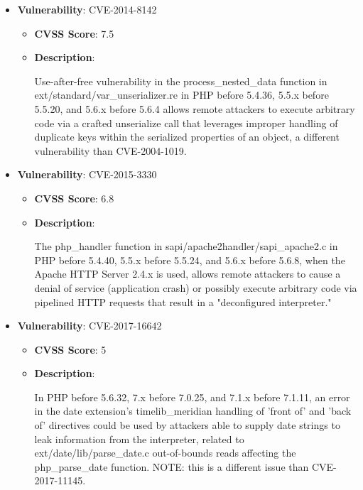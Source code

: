 \documentclass{article}
\begin{document}
\begin{itemize}
        \item \textbf{Vulnerability}: CVE-2014-8142
        \begin{itemize}
            \item \textbf{CVSS Score}:  7.5 
            \item \textbf{Description}:
            \parbox[t]{0.9\linewidth}{
                \ttfamily Use-after-free vulnerability in the process\_nested\_data function in ext/standard/var\_unserializer.re in PHP before 5.4.36, 5.5.x before 5.5.20, and 5.6.x before 5.6.4 allows remote attackers to execute arbitrary code via a crafted unserialize call that leverages improper handling of duplicate keys within the serialized properties of an object, a different vulnerability than CVE-2004-1019.
            }
        \end{itemize}
    
        \item \textbf{Vulnerability}: CVE-2015-3330
        \begin{itemize}
            \item \textbf{CVSS Score}:  6.8 
            \item \textbf{Description}:
            \parbox[t]{0.9\linewidth}{
                \ttfamily The php\_handler function in sapi/apache2handler/sapi\_apache2.c in PHP before 5.4.40, 5.5.x before 5.5.24, and 5.6.x before 5.6.8, when the Apache HTTP Server 2.4.x is used, allows remote attackers to cause a denial of service (application crash) or possibly execute arbitrary code via pipelined HTTP requests that result in a "deconfigured interpreter."
            }
        \end{itemize}
    
        \item \textbf{Vulnerability}: CVE-2017-16642
        \begin{itemize}
            \item \textbf{CVSS Score}:  5 
            \item \textbf{Description}:
            \parbox[t]{0.9\linewidth}{
                \ttfamily In PHP before 5.6.32, 7.x before 7.0.25, and 7.1.x before 7.1.11, an error in the date extension's timelib\_meridian handling of 'front of' and 'back of' directives could be used by attackers able to supply date strings to leak information from the interpreter, related to ext/date/lib/parse\_date.c out-of-bounds reads affecting the php\_parse\_date function. NOTE: this is a different issue than CVE-2017-11145.
            }
        \end{itemize}
    
\end{itemize}
\end{document}
